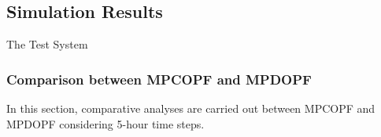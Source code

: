 \documentclass[../../outputs/main.tex]{subfiles}
\begin{document}
\subsection{Simulation Results}

The Test System 

\subsubsection{Comparison between MPCOPF and MPDOPF}
In this section, comparative analyses are carried out between MPCOPF and MPDOPF considering 5-hour time steps.



\end{document}
